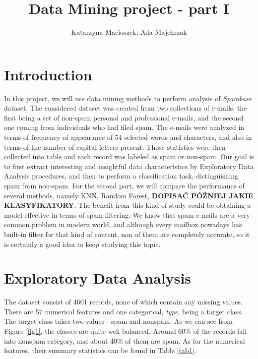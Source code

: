 \documentclass{article}\usepackage[]{graphicx}\usepackage[]{xcolor}
\author{Katarzyna Macioszek, Ada Majchrzak}
\title{Data Mining project - part I}
\begin{document}
\maketitle

\section{Introduction}

In this project, we will use data mining methods to perform analysis of \textit{Spambase}
dataset. The considered dataset was created from two collections of e-mails, 
the first being a set of non-spam personal and professional e-mails, and the 
second one coming from individuals who had filed spam. The e-mails were 
analyzed in terms of frequency of appearance of 54 selected words and characters,
and also in terms of the number of capital letters present. 
Those statistics were then collected into table and each record was labeled 
as spam or non-spam. Our goal is to first extract interesting and insightful data characteristics
by Exploratory Data Analysis procedures, and then to perform a classification task,
distinguishing spam from non-spam. For the second part, we will compare the performance
of several methods, namely KNN, Random Forest, \textbf{DOPISAĆ PÓŹNIEJ JAKIE KLASYFIKATORY}.
The benefit from this kind of study could be obtaining a model effective in terms 
of spam filtering. We know that spam e-mails are a very common problem in modern 
world, and although every mailbox nowadays has built-in filter for that kind
of content, non of them are completely accurate, so it is certainly a good idea
to keep studying this topic.

\section{Exploratory Data Analysis}



The dataset consist of 4601 records, none of which contain any missing values.
There are 57 numerical features and one categorical, \textit{type}, being a target class.
The target class takes two values - spam and nonspam. As we can see from Figure \ref{fig1},
the classes are quite well balanced. Around 60\% of the records fall into nonspam category,
and about 40\% of them are spam. As for the numerical features, their summary statistics
can be found in Table \ref{tab1}.
\end{document}
